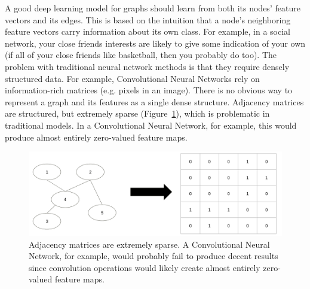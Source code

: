 A good deep learning model for graphs should learn from both its nodes' feature vectors and its edges. This is based on the intuition that a node's neighboring feature vectors carry information about its own class. For example, in a social network, your close friends interests are likely to give some indication of your own (if all of your close friends like basketball, then you probably do too). The problem with traditional neural network methods is that they require densely structured data. For example, Convolutional Neural Networks rely on information-rich matrices (e.g. pixels in an image). There is no obvious way to represent a graph and its features as a single dense structure. Adjacency matrices are structured, but extremely sparse (Figure~\ref{fig:sparse}), which is problematic in traditional models. In a Convolutional Neural Network, for example, this would produce almost entirely zero-valued feature maps. 

\begin{figure}[h!]
	\centering
	\includegraphics[width=1\linewidth]{media/sparse.png} 
	\caption{Adjacency matrices are extremely sparse. A Convolutional Neural Network, for example, would probably fail to produce decent results since convolution operations would likely create almost entirely zero-valued feature maps.}
	\label{fig:sparse}
\end{figure}
